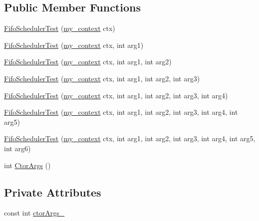 \subsection*{Public Member Functions}
\begin{DoxyCompactItemize}
\item 
\mbox{\hyperlink{struct_fifo_scheduler_test_a1daf713197f381d478f82f15e8a47a54}{Fifo\+Scheduler\+Test}} (\mbox{\hyperlink{classboost_1_1statechart_1_1event__processor_a99f1c6ec8419ec82f140c5c93c5eb8cd}{my\+\_\+context}} ctx)
\item 
\mbox{\hyperlink{struct_fifo_scheduler_test_aeae2265a239f2cf752b654904a3b4de7}{Fifo\+Scheduler\+Test}} (\mbox{\hyperlink{classboost_1_1statechart_1_1event__processor_a99f1c6ec8419ec82f140c5c93c5eb8cd}{my\+\_\+context}} ctx, int arg1)
\item 
\mbox{\hyperlink{struct_fifo_scheduler_test_acbfc86a2b37ae1288d9153490dad2b0d}{Fifo\+Scheduler\+Test}} (\mbox{\hyperlink{classboost_1_1statechart_1_1event__processor_a99f1c6ec8419ec82f140c5c93c5eb8cd}{my\+\_\+context}} ctx, int arg1, int arg2)
\item 
\mbox{\hyperlink{struct_fifo_scheduler_test_a985330aa351673bdeb18b32209831176}{Fifo\+Scheduler\+Test}} (\mbox{\hyperlink{classboost_1_1statechart_1_1event__processor_a99f1c6ec8419ec82f140c5c93c5eb8cd}{my\+\_\+context}} ctx, int arg1, int arg2, int arg3)
\item 
\mbox{\hyperlink{struct_fifo_scheduler_test_aeebfc2353f55b8120cb887814b16a72c}{Fifo\+Scheduler\+Test}} (\mbox{\hyperlink{classboost_1_1statechart_1_1event__processor_a99f1c6ec8419ec82f140c5c93c5eb8cd}{my\+\_\+context}} ctx, int arg1, int arg2, int arg3, int arg4)
\item 
\mbox{\hyperlink{struct_fifo_scheduler_test_a9114b2e58163bbe2bf1d947b685ccafa}{Fifo\+Scheduler\+Test}} (\mbox{\hyperlink{classboost_1_1statechart_1_1event__processor_a99f1c6ec8419ec82f140c5c93c5eb8cd}{my\+\_\+context}} ctx, int arg1, int arg2, int arg3, int arg4, int arg5)
\item 
\mbox{\hyperlink{struct_fifo_scheduler_test_ae33100bd4bdb46289ade20447edaf6c3}{Fifo\+Scheduler\+Test}} (\mbox{\hyperlink{classboost_1_1statechart_1_1event__processor_a99f1c6ec8419ec82f140c5c93c5eb8cd}{my\+\_\+context}} ctx, int arg1, int arg2, int arg3, int arg4, int arg5, int arg6)
\item 
int \mbox{\hyperlink{struct_fifo_scheduler_test_a70f4d02cb06c1d52be2138a0b5a40767}{Ctor\+Args}} ()
\end{DoxyCompactItemize}
\subsection*{Private Attributes}
\begin{DoxyCompactItemize}
\item 
const int \mbox{\hyperlink{struct_fifo_scheduler_test_a0b3c57e6e0a5139706958649c8e70431}{ctor\+Args\+\_\+}}
\end{DoxyCompactItemize}
